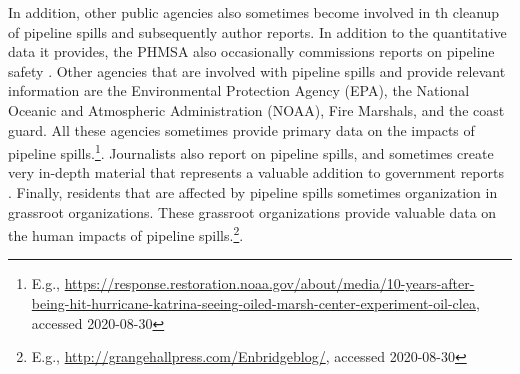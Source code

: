 In addition, other public agencies also sometimes become involved in th cleanup of pipeline spills and subsequently author reports. In addition to the quantitative data it provides, the PHMSA also occasionally commissions reports on pipeline safety \citep[e.g.,]{Shaw2012}. Other agencies that are involved with pipeline spills and provide relevant information are the Environmental Protection Agency (EPA), the National Oceanic and Atmospheric Administration (NOAA), Fire Marshals, and the coast guard. All these agencies sometimes provide primary data on the impacts of pipeline spills.\footnote{E.g., \url{https://response.restoration.noaa.gov/about/media/10-years-after-being-hit-hurricane-katrina-seeing-oiled-marsh-center-experiment-oil-clea}, accessed 2020-08-30}. Journalists also report on pipeline spills, and sometimes create very in-depth material that represents a valuable addition to government reports \citep[e.g.,][]{McGowan2012}. Finally, residents that are affected by pipeline spills sometimes organization in grassroot organizations. These grassroot organizations provide valuable data on the human impacts of pipeline spills.\footnote{E.g., \url{http://grangehallpress.com/Enbridgeblog/}, accessed 2020-08-30}.



